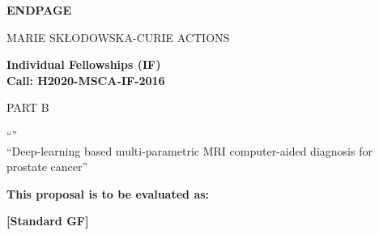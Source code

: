 \newpage
\vspace{15mm}
\begin{center}


        \Large{


        \textbf{ENDPAGE}

          \vspace{15mm}
          MARIE SK\L{}ODOWSKA-CURIE ACTIONS\\
          \vspace{1cm}

          \textbf{Individual Fellowships (IF)}\\
          \textbf{Call: H2020-MSCA-IF-2016}
          \vspace{2cm}

          PART B
          \vspace{2.5cm}

          ``\proposalAcronym''\\
          \vspace{1cm}
          ``Deep-learning based multi-parametric MRI computer-aided diagnosis for prostate cancer''
          \vspace{1cm}

          \textbf{This proposal is to be evaluated as:}
          \vspace{.5cm}

          \textbf{[Standard GF]}
        }

  \end{center}
\vspace{1cm}
